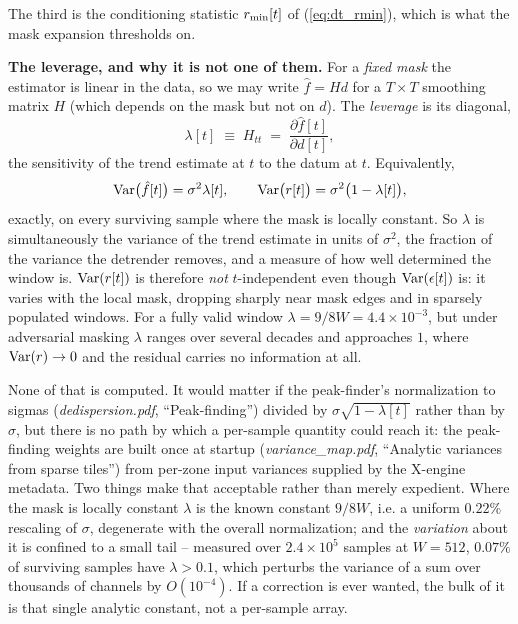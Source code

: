 \documentclass{article}
\numberwithin{equation}{section}   %
\newcommand{\ddnotes}[1]{{\em dedispersion.pdf}, ``#1''}
\newcommand{\vmnotes}[1]{{\em variance\_map.pdf}, ``#1''}
\begin{document}
The third is the conditioning statistic $r_{\rm min}[t]$ of (\ref{eq:dt_rmin}), which is what the mask
expansion thresholds on.

{\bf The leverage, and why it is not one of them.}  For a {\em fixed mask} the estimator is linear in the data,
so we may write $\hat f = Hd$ for a $T \times T$ smoothing matrix $H$ (which depends on the mask but not on
$d$).  The {\em leverage} is its diagonal,
\begin{equation}
\lambda[t] \;\equiv\; H_{tt} \;=\; \frac{\partial \hat f[t]}{\partial d[t]} ,
\label{eq:dt_leverage_def}
\end{equation}
the sensitivity of the trend estimate at $t$ to the datum at $t$.  Equivalently,
\begin{equation}
{\rm Var}\big(\hat f[t]\big) = \sigma^2 \lambda[t],
\qquad
{\rm Var}\big(r[t]\big) = \sigma^2 \big(1 - \lambda[t]\big) ,
\label{eq:dt_var_r}
\end{equation}
exactly, on every surviving sample where the mask is locally constant.  So $\lambda$ is simultaneously the
variance of the trend estimate in units of $\sigma^2$, the fraction of the variance the detrender removes, and
a measure of how well determined the window is.  ${\rm Var}(r[t])$ is therefore {\em not} $t$-independent even
though ${\rm Var}(\epsilon[t])$ is: it varies with the local mask, dropping sharply near mask edges and in
sparsely populated windows.  For a fully valid window $\lambda = 9/8W = 4.4\times10^{-3}$, but under
adversarial masking $\lambda$ ranges over several decades and approaches $1$, where
${\rm Var}(r) \rightarrow 0$ and the residual carries no information at all.

None of that is computed.  It would matter if the peak-finder's normalization to sigmas
(\ddnotes{Peak-finding}) divided by $\sigma\sqrt{1-\lambda[t]}$ rather than by $\sigma$, but there is no path
by which a per-sample quantity could reach it: the peak-finding weights are built once at startup
(\vmnotes{Analytic variances from sparse tiles}) from per-zone input variances supplied by the X-engine metadata.  Two things
make that acceptable rather than merely expedient.  Where the mask is locally constant $\lambda$ is the known
constant $9/8W$, i.e. a uniform $0.22\%$ rescaling of $\sigma$, degenerate with the overall normalization; and
the {\em variation} about it is confined to a small tail -- measured over $2.4\times10^5$ samples at $W=512$,
$0.07\%$ of surviving samples have $\lambda > 0.1$, which perturbs the variance of a sum over thousands of
channels by $O(10^{-4})$.  If a correction is ever wanted, the bulk of it is that single analytic constant, not
a per-sample array.
\end{document}
